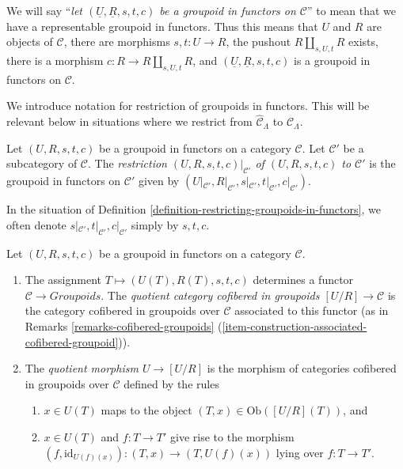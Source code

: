 \begin{remark}
\label{remark-simplify-terminology}
We will say ``{\it let $(\underline{U}, \underline{R}, s, t, c)$ be a
groupoid in functors on $\mathcal{C}$}'' to mean that we have
a representable groupoid in functors. Thus this means that
$U$ and $R$ are objects of $\mathcal{C}$, there are morphisms
$s, t : U \to R$, the pushout $R \amalg_{s, U, t} R$ exists,
there is a morphism $c : R \to R \amalg_{s, U, t} R$, and
$(\underline{U}, \underline{R}, s, t, c)$ is a
groupoid in functors on $\mathcal{C}$.
\end{remark}

\noindent
We introduce notation for restriction of groupoids in functors. This will be 
relevant below in situations where we restrict from $\widehat{\mathcal 
C}_\Lambda$ to $\mathcal{C}_\Lambda$.

\begin{definition}
\label{definition-restricting-groupoids-in-functors}
Let $(U,R,s,t,c)$ be a groupoid in functors on a category $\mathcal{C}$.  Let 
$\mathcal{C}'$ be a subcategory of $\mathcal{C}$.  The {\it restriction 
$(U,R,s,t,c)|_{\mathcal{C}'}$ of $(U,R,s,t,c)$ to $\mathcal{C}'$} is the
groupoid 
in functors on $\mathcal{C}'$ given by $(U|_{\mathcal{C}'},R|_{\mathcal 
C'},s|_{\mathcal{C}'},t|_{\mathcal{C}'},c|_{\mathcal{C}'})$.
\end{definition}

\begin{remark}
\label{remark-notation-restriction}
In the situation of Definition 
\ref{definition-restricting-groupoids-in-functors}, we often denote 
$s|_{\mathcal{C}'},t|_{\mathcal{C}'},c|_{\mathcal{C}'}$ simply by $s,t,c$.
\end{remark}

\begin{definition}
\label{definition-quotient}
Let $(U,R,s,t,c)$ be a groupoid in functors on a category $\mathcal{C}$. 
\begin{enumerate}
\item The assignment $T \mapsto  (U(T), R(T), s,t,c)$ determines a functor 
$\mathcal{C} \to \textit{Groupoids}$. The {\it quotient category 
cofibered in groupoids $[U/R] \to \mathcal{C}$} is the category 
cofibered in groupoids over $\mathcal{C}$ associated to this functor (as in 
Remarks \ref{remarks-cofibered-groupoids} 
(\ref{item-construction-associated-cofibered-groupoid})).  
\item The {\it quotient morphism $U \to [U/R]$} is the morphism of
categories cofibered in groupoids over $\mathcal{C}$ defined by the
rules
\begin{enumerate}
\item $x \in U(T)$ maps to the object $(T, x) \in \text{Ob}([U/R](T))$, and
\item $x \in U(T)$ and $f : T \to T'$ give rise to the morphism
$(f, \text{id}_{U(f)(x)}): (T, x) \to (T, U(f)(x))$ lying over
$f : T \to T'$.
\end{enumerate} 
\end{enumerate} 
\end{definition}





